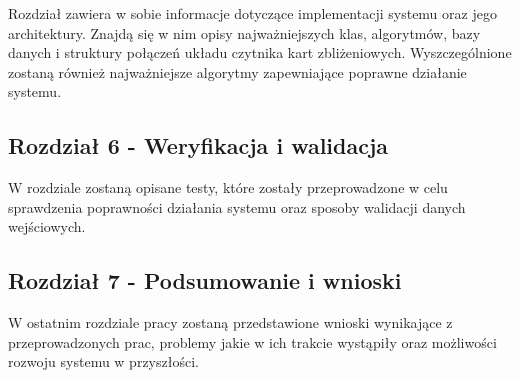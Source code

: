 Rozdział zawiera w sobie informacje dotyczące implementacji systemu oraz jego architektury. Znajdą się w nim opisy najważniejszych klas, algorytmów, bazy danych i struktury połączeń układu czytnika kart zbliżeniowych. Wyszczególnione zostaną również najważniejsze algorytmy zapewniające poprawne działanie systemu.

\subsection*{Rozdział 6 - Weryfikacja i walidacja}

W rozdziale zostaną opisane testy, które zostały przeprowadzone w celu sprawdzenia poprawności działania systemu oraz sposoby walidacji danych wejściowych.

\subsection*{Rozdział 7 - Podsumowanie i wnioski}

W ostatnim rozdziale pracy zostaną przedstawione wnioski wynikające z przeprowadzonych prac, problemy jakie w ich trakcie wystąpiły oraz możliwości rozwoju systemu w przyszłości.


